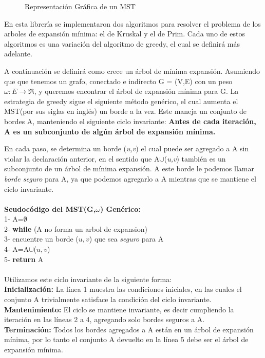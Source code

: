 \documentclass[a4paper, 11pt]{report}
\newcommand{\DrawEJGraph}[5]{

    \begin{scope}[#4]
    \foreach \pos/\nodo in {{(0,0)/4}, {(0,2.2)/5}, {(1.5,1.7)/7}, {(3,3)/1}, {(3,1)/0}, {(4.5,1.7)/2}, {(4.5,3)/3}, {(7,0)/6}}
        \node[vertex] (#3\nodo) at \pos {\nodo};

    \foreach \start/\end/\weight in {4/5/0.35, 5/7/0.28, 7/1/0.19,7/0/0.16,0/2/0.26,2/3/0.17,2/6/0.40,4/7/0.37,1/5/0.32,0/4/0.38,1/2/0.36,1/3/0.29,2/7/0.34,3/6/0.52,6/0/0.58,6/4/0.93}
        \path[edge,#5] (#3\start) --node[weight,midway,fill=white] {$\weight$} (#3\end);

    \foreach \nodo in {#1}
        \node[selected vertex] at (#3\nodo) {\nodo};

    \begin{pgfonlayer}{background}
        \foreach \start/\end in {#2}
            \path[rojog edge,#5] (#3\start) -- (#3\end);
    \end{pgfonlayer}
    \end{scope}

}
\begin{document}
\begin{figure}[!h]
    \centering
    \caption{Representaci\'on Gr\'afica de un MST}
    \label{MST1}
\end{figure}

En esta librería se implementaron dos algoritmos para resolver el problema de los arboles de expansión mínima: el de Kruskal y el de Prim. Cada uno de estos algoritmos es una variación del algoritmo de greedy, el cual se definirá más adelante. 

A continuación se definirá como crece un árbol de mínima expansión. Asumiendo que que tenemos un grafo, conectado e indirecto G = (V,E) con un peso $\omega: E \longrightarrow  \Re$, y queremos encontrar el árbol de expansión mínima para G. La estrategia de greedy sigue el siguiente método genérico, el cual aumenta el MST(por sus siglas en inglés) un borde a la vez. Este maneja un conjunto de bordes A, manteniendo el siguiente ciclo invariante: \textbf{Antes de cada iteración, A es un subconjunto de algún árbol de expansión mínima.}

En cada paso, se determina un borde (\textit{u,v}) el cual puede ser agregado a A sin violar la declaración anterior, en el sentido que A$\cup${(\textit{u,v})} también es un subconjunto de un árbol de mínima expansión. A este borde le podemos llamar \textit{borde seguro} para A, ya que podemos agregarlo a A mientras que se mantiene el ciclo invariante.\\ \\
\textbf{Seudocódigo del MST(G,$ \omega$) Genérico: }\\
1- A=$ \emptyset$\\
2- \textbf{while} (A no forma un arbol de expansion)\\
3- 	\indent	encuentre un borde ($u,v$) que sea \textit{seguro} para A\\ 4- 	\indent	A=A$\cup${($u,v$)}\\
5- \textbf{return} A\\
\\
Utilizamos este ciclo invariante de la siguiente forma:
\\
\textbf{Inicialización:} La línea 1 muestra las condiciones iniciales, en las cuales el conjunto A trivialmente satisface la condición del ciclo invariante.  \\
\textbf{Mantenimiento:} El ciclo se mantiene invariante, es decir cumpliendo la iteración en las líneas 2 a 4, agregando solo bordes seguros a A.\\
\textbf{Terminación:} Todos los bordes agregados a A están en un árbol de expansión mínima, por lo tanto el conjunto A devuelto en la línea 5 debe ser el árbol de expansión mínima.
\end{document}
